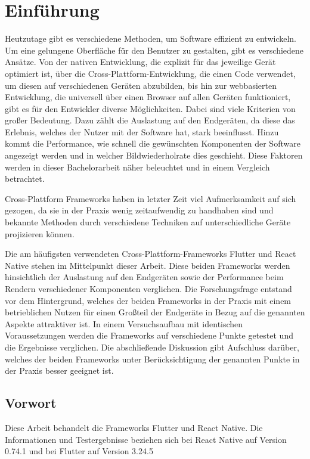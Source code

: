 \section{Einführung}
Heutzutage gibt es verschiedene Methoden, um Software effizient zu entwickeln. Um eine gelungene Oberfläche für den Benutzer zu gestalten, gibt es verschiedene Ansätze. Von der nativen Entwicklung, die explizit für das jeweilige Gerät optimiert ist, über die Cross-Plattform-Entwicklung, die einen Code verwendet, um diesen auf verschiedenen Geräten abzubilden, bis hin zur webbasierten Entwicklung, die universell über einen Browser auf allen Geräten funktioniert, gibt es für den Entwickler diverse Möglichkeiten. Dabei sind viele Kriterien von großer Bedeutung. Dazu zählt die Auslastung auf den Endgeräten, da diese das Erlebnis, welches der Nutzer mit der Software hat, stark beeinflusst. Hinzu kommt die Performance, wie schnell die gewünschten Komponenten der Software angezeigt werden und in welcher Bildwiederholrate dies geschieht. Diese Faktoren werden in dieser Bachelorarbeit näher beleuchtet und in einem Vergleich betrachtet.

Cross-Plattform Frameworks haben in letzter Zeit viel Aufmerksamkeit auf sich gezogen, da sie in der Praxis wenig zeitaufwendig zu handhaben sind und bekannte Methoden durch verschiedene Techniken auf unterschiedliche Geräte projizieren können.

Die am häufigsten verwendeten Cross-Plattform-Frameworks Flutter und React Native \cite{StatistaWorkingHours} stehen im Mittelpunkt dieser Arbeit. Diese beiden Frameworks werden hinsichtlich der Auslastung auf den Endgeräten sowie der Performance beim Rendern verschiedener Komponenten verglichen. Die Forschungsfrage entstand vor dem Hintergrund, welches der beiden Frameworks in der Praxis mit einem betrieblichen Nutzen für einen Großteil der Endgeräte in Bezug auf die genannten Aspekte attraktiver ist. In einem Versuchsaufbau mit identischen Voraussetzungen werden die Frameworks auf verschiedene Punkte getestet und die Ergebnisse verglichen. Die abschließende Diskussion gibt Aufschluss darüber, welches der beiden Frameworks unter Berücksichtigung der genannten Punkte in der Praxis besser geeignet ist.

\subsection{Vorwort}
Diese Arbeit behandelt die Frameworks Flutter und React Native. Die Informationen und Testergebnisse beziehen sich bei React Native auf Version 0.74.1 und bei Flutter auf Version 3.24.5
